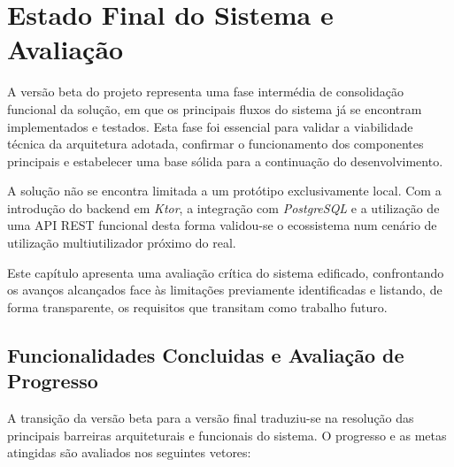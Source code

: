 %
%
\chapter{Estado Final do Sistema e Avaliação} \label{cap:estado-final}

A versão beta do projeto representa uma fase intermédia de consolidação funcional da solução, em que os principais fluxos do sistema já se encontram implementados e testados. Esta fase foi essencial para validar a viabilidade técnica da arquitetura adotada, confirmar o funcionamento dos componentes
principais e estabelecer uma base sólida para a continuação do desenvolvimento.

A solução não se encontra limitada a um protótipo exclusivamente local. Com a
introdução do backend em \textit{Ktor}, a integração com \textit{PostgreSQL} e a utilização de uma API REST funcional desta forma validou-se o ecossistema num cenário de utilização multiutilizador próximo do real.

Este capítulo apresenta uma avaliação crítica do sistema edificado, confrontando os avanços alcançados face às limitações previamente identificadas e listando, de forma transparente, os requisitos que transitam como trabalho futuro.

\section{Funcionalidades Concluidas e Avaliação de Progresso}

A transição da versão beta para a versão final traduziu-se na resolução das principais barreiras arquiteturais e funcionais do sistema. O progresso e as metas atingidas são avaliados nos seguintes vetores:


